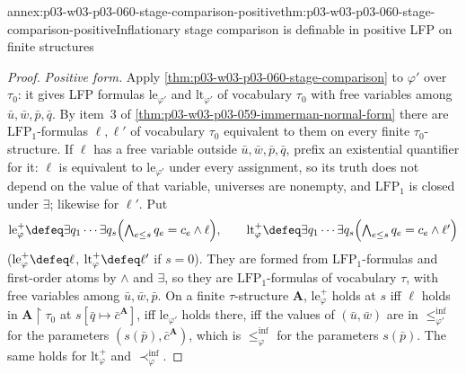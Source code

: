 \begin{annexitem}{annex:p03-w03-p03-060-stage-comparison-positive}{thm:p03-w03-p03-060-stage-comparison-positive}{Inflationary stage comparison is definable in positive LFP on finite structures}
\begin{proof}
\emph{Positive form.} Apply \cref{thm:p03-w03-p03-060-stage-comparison} to
\(\varphi'\) over \(\tau_0\): it gives LFP formulas
\(\mathrm{le}_{\varphi'}\) and \(\mathrm{lt}_{\varphi'}\) of vocabulary
\(\tau_0\) with free variables among \(\bar u,\bar w,\bar p,\bar q\). By
item~3 of \cref{thm:p03-w03-p03-059-immerman-normal-form} there are
\(\mathrm{LFP}_1\)-formulas \(\ell,\ell'\) of vocabulary \(\tau_0\)
equivalent to them on every finite \(\tau_0\)-structure. If \(\ell\) has a
free variable outside \(\bar u,\bar w,\bar p,\bar q\), prefix an
existential quantifier for it: \(\ell\) is equivalent to
\(\mathrm{le}_{\varphi'}\) under every assignment, so its truth does not
depend on the value of that variable, universes are nonempty, and
\(\mathrm{LFP}_1\) is closed under \(\exists\); likewise for \(\ell'\). Put
\[
 \mathrm{le}^+_\varphi\defeq\exists q_1\cdots\exists q_s\Bigl(\textstyle\bigwedge_{e\le s}q_e=c_e\wedge\ell\Bigr),\qquad
 \mathrm{lt}^+_\varphi\defeq\exists q_1\cdots\exists q_s\Bigl(\textstyle\bigwedge_{e\le s}q_e=c_e\wedge\ell'\Bigr)
\]
(\(\mathrm{le}^+_\varphi\defeq\ell\), \(\mathrm{lt}^+_\varphi\defeq\ell'\)
if \(s=0\)). They are formed from \(\mathrm{LFP}_1\)-formulas and
first-order atoms by \(\wedge\) and \(\exists\), so they are
\(\mathrm{LFP}_1\)-formulas of vocabulary \(\tau\), with free variables
among \(\bar u,\bar w,\bar p\). On a finite \(\tau\)-structure
\(\mathbf A\), \(\mathrm{le}^+_\varphi\) holds at \(s\) iff \(\ell\) holds in
\(\mathbf A{\restriction}\tau_0\) at \(s[\bar q\mapsto\bar c^{\mathbf A}]\),
iff \(\mathrm{le}_{\varphi'}\) holds there, iff the values of
\((\bar u,\bar w)\) are in \(\le^{\mathrm{inf}}_{\varphi'}\) for the
parameters \((s(\bar p),\bar c^{\mathbf A})\), which is
\(\le^{\mathrm{inf}}_\varphi\) for the parameters \(s(\bar p)\). The same
holds for \(\mathrm{lt}^+_\varphi\) and \(\prec^{\mathrm{inf}}_\varphi\).
\end{proof}
\end{annexitem}

